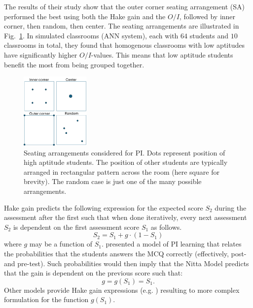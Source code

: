 \documentclass[twocolumn,secnumarabic,amssymb, nobibnotes, aps, prd]{revtex4-2}
\begin{document}
    The results of their study show that the outer corner seating arrangement (SA) performed the best using both the Hake gain and the $O/I$, followed by inner corner, then random, then center.
    The seating arrangements are illustrated in Fig.~\ref{fig:PI-SAs}.
    In simulated classrooms (ANN system), each with $64$ students and $10$ classrooms in total, they found that homogenous classrooms with low aptitudes have significantly higher $O/I$-values.
    This means that low aptitude students benefit the most from being grouped together.
    \begin{figure}[htb]
        \centering
        \includegraphics[width=0.30\textwidth]{figures/PI SAs.png}
        \caption{%
        Seating arrangements considered for PI.
        Dots represent position of high aptitude students.
        The position of other students are typically arranged in rectangular pattern across the room (here square for brevity).
        The random case is just one of the many possible arrangements.
        }
        \label{fig:PI-SAs}
    \end{figure}

    Hake gain predicts the following expression for the expected score $S_2$ during the assessment after the first such that when done iteratively, every next assessment $S_2$ is dependent on the first assessment score $S_1$ as follows.
    \begin{equation}
        S_2 = S_1 + g\cdot(1-S_1)
        \label{eq:nitta_model}
    \end{equation}
    where $g$ may be a function of $S_1$.
    \citet{nitta2019mathematical} presented a model of PI learning that relates the probabilities that the students answers the MCQ correctly (effectively, post- and pre-test).
    Such probabilities would then imply that the Nitta Model predicts that the gain is dependent on the previous score such that:
    \begin{equation}
        g = g(S_1) = S_1.
        \label{eq:nitta_gain}
    \end{equation}
    Other models provide Hake gain expressions (e.g. \citet{pritchard2008mathematical}) resulting to more complex formulation for the function $g(S_1)$.
\end{document}
